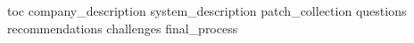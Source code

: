 \documentclass[unknownkeysallowed]{beamer}
\begin{document}

\begin{frame}
  \titlepage
\end{frame}

{toc}
{company_description}
{system_description}
{patch_collection}
{questions}
{recommendations}
{challenges}
{final_process}


\begin{frame}[allowframebreaks]

  \printbibliography

\end{frame}


\appendix
\end{document}
